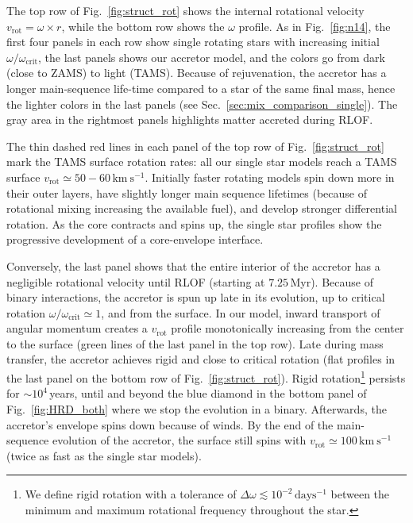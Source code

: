 \documentclass[twocolumn,twocolappendix,trackchanges]{aastex63}
\newcommand{\kms}{{\mathrm{km\ s^{-1}}}}
\DeclareRobustCommand{\Figref}[1]{Fig.~\ref{#1}}
\DeclareRobustCommand{\Secref}[1]{Sec.~\ref{#1}}
\begin{document}
The top row of \Figref{fig:struct_rot} shows the internal rotational
velocity $v_\mathrm{rot}=\omega\times r$, while the bottom row shows
the $\omega$ profile. As in \Figref{fig:n14}, the first four panels in
each row show single rotating stars with increasing initial
$\omega/\omega_\mathrm{crit}$, the last panels shows our accretor
model, and the colors go from dark (close to ZAMS) to light
(TAMS). Because of rejuvenation, the accretor has a longer
main-sequence life-time compared to a star of the same final mass,
hence the lighter colors in the last panels (see
\Secref{sec:mix_comparison_single}). The gray area in the rightmost
panels highlights matter accreted during RLOF.

The thin dashed red lines in each panel of the top row of
\Figref{fig:struct_rot} mark the TAMS surface rotation rates: all our
single star models reach a TAMS surface
$v_\mathrm{rot}\simeq50-60\,\kms$. Initially faster rotating models
spin down more in their outer layers, have slightly longer main
sequence lifetimes (because of rotational mixing increasing the
available fuel), and develop stronger differential rotation. As the
core contracts and spins up, the single star profiles show the
progressive development of a core-envelope interface.

Conversely, the last panel shows that the entire interior of the
accretor has a negligible rotational velocity until RLOF (starting at
$7.25$\,Myr). Because of binary interactions, the accretor is spun up
late in its evolution, up to critical rotation
$\omega/\omega_\mathrm{crit}\simeq1$, and from the surface. In our
model, inward transport of angular momentum creates a $v_\mathrm{rot}$
profile monotonically increasing from the center to the surface (green
lines of the last panel in the top row). Late during mass transfer,
the accretor achieves rigid and close to critical rotation (flat
profiles in the last panel on the bottom row of
\Figref{fig:struct_rot}). Rigid rotation\footnote{We define rigid
  rotation with a tolerance of
$\Delta \omega \lesssim 10^{-2}\,\mathrm{days^{-1}}$ between the minimum and maximum
rotational frequency throughout the star.} persists for
$\sim10^{4}$\,years, until and beyond the blue diamond in the bottom
panel of \Figref{fig:HRD_both} where we stop the evolution in a
binary. Afterwards, the accretor's envelope spins down
because of winds. By the end of the main-sequence evolution of the
accretor, the surface still spins with $v_\mathrm{rot}\simeq100\,\kms$
(twice as fast as the single star models).
\end{document}
